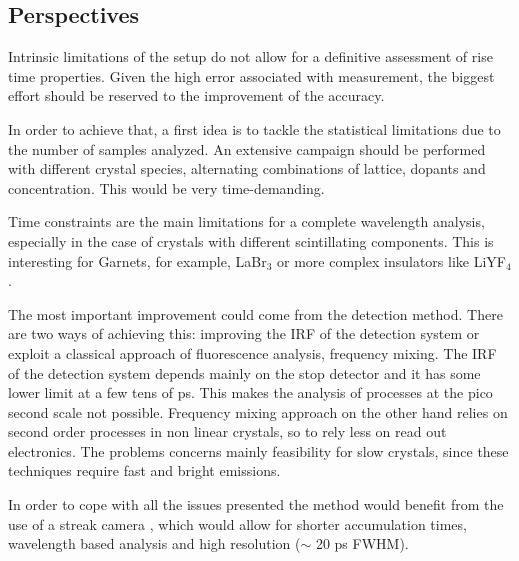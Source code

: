\subsection{Perspectives}
Intrinsic limitations of the setup do not allow for a definitive assessment of rise time properties. Given the high error associated with measurement, the biggest effort should be reserved to the improvement of the accuracy.

In order to achieve that, a first idea is to tackle the statistical limitations due to the number of samples analyzed. An extensive campaign should be performed with different crystal species, alternating combinations of lattice, dopants and concentration. This would be very time-demanding.

Time constraints are the main limitations for a complete wavelength analysis, especially in the case of crystals with different scintillating components. This is interesting for Garnets, for example, LaBr$_{3}$ or more complex insulators like LiYF$_{4}$.

The most important improvement could come from the detection method. There are two ways of achieving this: improving the IRF of the detection system or exploit a classical approach of fluorescence analysis, frequency mixing. The IRF of the detection system depends mainly on the stop detector and it has some lower limit at a few tens of ps. This makes the analysis of processes at the pico second scale not possible.
Frequency mixing approach on the other hand relies on second order processes in non linear crystals, so to rely less on read out electronics. The problems concerns mainly feasibility for slow crystals, since these techniques require fast and bright emissions.

In order to cope with all the issues presented the method would benefit from the use of a streak camera \cite{streak}, which would allow for shorter accumulation times, wavelength based analysis and high resolution ($\sim$ 20 ps FWHM). 